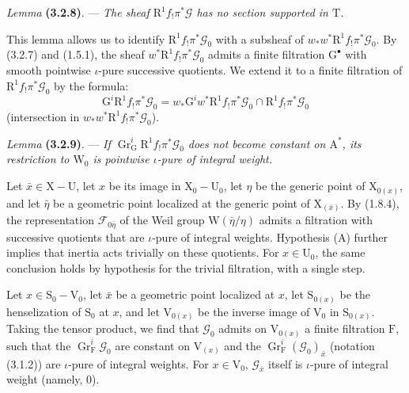\documentclass[11pt,leqno]{article}
\begin{document}
\textit{Lemma} \textbf{(3.2.8)}. — \textit{The sheaf \(\mathrm{R}^1f_!\pi^*\mathscr{G}\) has no section supported in \(\mathrm{T}\).}

This lemma allows us to identify \(\mathrm{R}^1f_!\pi^*\mathscr{G}_0\) with a subsheaf of \(w_*w^*\mathrm{R}^1f_!\pi^*\mathscr{G}_0\). By (3.2.7) and (1.5.1), the sheaf \(w^*\mathrm{R}^1f_!\pi^*\mathscr{G}_0\) admits a finite filtration \(\mathrm{G}^\bullet\) with smooth pointwise \(\iota\)-pure successive quotients. We extend it to a finite filtration of \(\mathrm{R}^1f_!\pi^*\mathscr{G}_0\) by the formula:
\[
\mathrm{G}^i\mathrm{R}^1f_!\pi^*\mathscr{G}_0
=w_*\mathrm{G}^iw^*\mathrm{R}^1f_!\pi^*\mathscr{G}_0
\cap\mathrm{R}^1f_!\pi^*\mathscr{G}_0
\]
(intersection in \(w_*w^*\mathrm{R}^1f_!\pi^*\mathscr{G}_0\)).

\textit{Lemma} \textbf{(3.2.9)}. — \textit{If \(\operatorname{Gr}_{\mathrm{G}}^i\mathrm{R}^1f_!\pi^*\mathscr{G}_0\) does not become constant on \(\mathrm{A}^*\), its restriction to \(\mathrm{W}_0\) is pointwise \(\iota\)-pure of integral weight.}

Let \(\bar{x}\in\mathrm{X}-\mathrm{U}\), let \(x\) be its image in \(\mathrm{X}_0-\mathrm{U}_0\), let \(\eta\) be the generic point of \(\mathrm{X}_{0(x)}\), and let \(\bar{\eta}\) be a geometric point localized at the generic point of \(\mathrm{X}_{(\bar{x})}\). By (1.8.4), the representation \(\mathscr{F}_{0\bar{\eta}}\) of the Weil group \(\mathrm{W}(\bar{\eta}/\eta)\) admits a filtration with successive quotients that are \(\iota\)-pure of integral weights. Hypothesis (A) further implies that inertia acts trivially on these quotients. For \(x\in\mathrm{U}_0\), the same conclusion holds by hypothesis for the trivial filtration, with a single step.

Let \(x\in\mathrm{S}_0-\mathrm{V}_0\), let \(\bar{x}\) be a geometric point localized at \(x\), let \(\mathrm{S}_{0(x)}\) be the henselization of \(\mathrm{S}_0\) at \(x\), and let \(\mathrm{V}_{0(x)}\) be the inverse image of \(\mathrm{V}_0\) in \(\mathrm{S}_{0(x)}\). Taking the tensor product, we find that \(\mathscr{G}_0\) admits on \(\mathrm{V}_{0(x)}\) a finite filtration \(\mathrm{F}\), such that the \(\operatorname{Gr}_{\mathrm{F}}^i\mathscr{G}_0\) are constant on \(\mathrm{V}_{(x)}\) and the \(\operatorname{Gr}_{\mathrm{F}}^i(\mathscr{G}_0)_{\bar{x}}\) (notation (3.1.2)) are \(\iota\)-pure of integral weights. For \(x\in\mathrm{V}_0\), \(\mathscr{G}_{\bar{x}}\) itself is \(\iota\)-pure of integral weight (namely, \(0\)).
\end{document}
